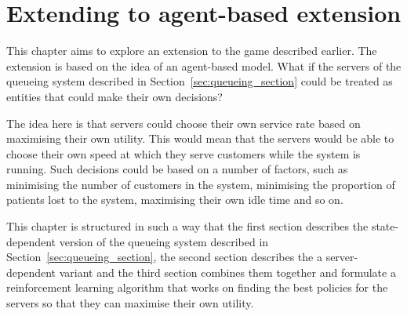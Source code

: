 \chapter{Extending to agent-based extension}

This chapter aims to explore an extension to the game described earlier.
The extension is based on the idea of an agent-based model.
What if the servers of the queueing system described in
Section~\ref{sec:queueing_section} could be treated as entities that could make
their own decisions?

The idea here is that servers could choose their own service rate based on
maximising their own utility.
This would mean that the servers would be able to choose their own speed at
which they serve customers while the system is running.
Such decisions could be based on a number of factors, such as minimising the
number of customers in the system, minimising the proportion of patients lost
to the system, maximising their own idle time and so on.

This chapter is structured in such a way that the first section describes the
state-dependent version of the queueing system described in
Section~\ref{sec:queueing_section}, the second section describes the
a server-dependent variant and the third section combines them together and
formulate a reinforcement learning algorithm that works on finding the best
policies for the servers so that they can maximise their own utility.









